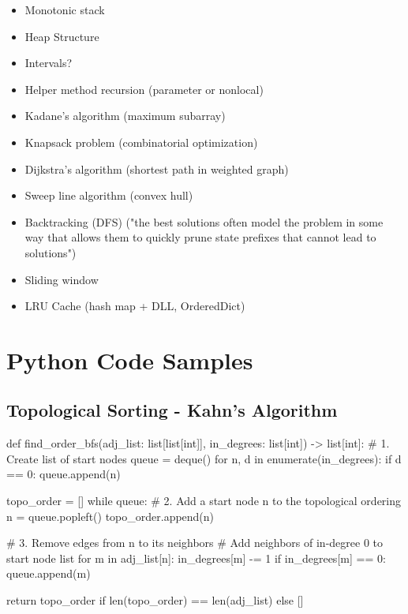 \documentclass[12pt]{article}
\begin{document}
\begin{itemize}
  \item {\color{red} Monotonic stack}
  \item {\color{red} Heap Structure}
  \item {\color{red} Intervals?}
  \item Helper method recursion (parameter or nonlocal)
  \item Kadane's algorithm (maximum subarray)
  \item Knapsack problem (combinatorial optimization)
  \item Dijkstra's algorithm (shortest path in weighted graph)
  \item Sweep line algorithm (convex hull)
  \item Backtracking (DFS) ("the best solutions often model the problem in some way that allows them to quickly prune state prefixes that cannot lead to solutions")
  \item Sliding window
  \item LRU Cache (hash map + DLL, OrderedDict)
\end{itemize}

\appendix

\section{Python Code Samples}

\subsection{Topological Sorting - Kahn's Algorithm}
\begin{python}
def find_order_bfs(adj_list: list[list[int]],
                   in_degrees: list[int]) -> list[int]:
    # 1. Create list of start nodes
    queue = deque()
    for n, d in enumerate(in_degrees):
        if d == 0:
            queue.append(n)

    topo_order = []
    while queue:
        # 2. Add a start node n to the topological ordering
        n = queue.popleft()
        topo_order.append(n)

        # 3. Remove edges from n to its neighbors
        #    Add neighbors of in-degree 0 to start node list
        for m in adj_list[n]:
            in_degrees[m] -= 1
            if in_degrees[m] == 0:
                queue.append(m)

    return topo_order if len(topo_order) == len(adj_list) else []
\end{python}
\end{document}
